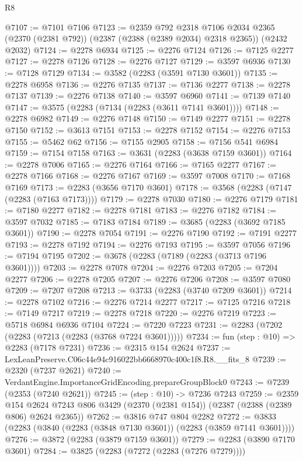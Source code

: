 \begin{lexlean}{R8}
\begin{coremodule}
@7107 := @7101 @7106
@7123 := @2359
    @792
    @2318
    @7106
    @2034
    @2365
    (@2370 (@2381 @792))
    (@2387 (@2388 (@2389 @2034) @2318 @2365))
    (@2432 @2032)
@7124 := @2278 @6934
@7125 := @2276 @7124
@7126 := @7125 @2277
@7127 := @2278 @7126
@7128 := @2276 @7127
@7129 := @3597 @6936
@7130 := @7128 @7129
@7134 := @3582 (@2283 (@3591 @7130 @3601))
@7135 := @2278 @6958
@7136 := @2276 @7135
@7137 := @7136 @2277
@7138 := @2278 @7137
@7139 := @2276 @7138
@7140 := @3597 @6960
@7141 := @7139 @7140
@7147 := @3575 (@2283 (@7134 (@2283 (@3611 @7141 @3601))))
@7148 := @2278 @6982
@7149 := @2276 @7148
@7150 := @7149 @2277
@7151 := @2278 @7150
@7152 := @3613 @7151
@7153 := @2278 @7152
@7154 := @2276 @7153
@7155 := @5462 @62
@7156 := @7155 @2905
@7158 := @7156 @541 @6984
@7159 := @7154 @7158
@7163 := @3631 (@2283 (@3638 @7159 @3601))
@7164 := @2278 @7006
@7165 := @2276 @7164
@7166 := @7165 @2277
@7167 := @2278 @7166
@7168 := @2276 @7167
@7169 := @3597 @7008
@7170 := @7168 @7169
@7173 := @2283 (@3656 @7170 @3601)
@7178 := @3568 (@2283 (@7147 (@2283 (@7163 @7173))))
@7179 := @2278 @7030
@7180 := @2276 @7179
@7181 := @7180 @2277
@7182 := @2278 @7181
@7183 := @2276 @7182
@7184 := @3597 @7032
@7185 := @7183 @7184
@7189 := @3685 (@2283 (@3692 @7185 @3601))
@7190 := @2278 @7054
@7191 := @2276 @7190
@7192 := @7191 @2277
@7193 := @2278 @7192
@7194 := @2276 @7193
@7195 := @3597 @7056
@7196 := @7194 @7195
@7202 := @3678 (@2283 (@7189 (@2283 (@3713 @7196 @3601))))
@7203 := @2278 @7078
@7204 := @2276 @7203
@7205 := @7204 @2277
@7206 := @2278 @7205
@7207 := @2276 @7206
@7208 := @3597 @7080
@7209 := @7207 @7208
@7213 := @3733 (@2283 (@3740 @7209 @3601))
@7214 := @2278 @7102
@7216 := @2276 @7214 @2277
@7217 := @7125 @7216
@7218 := @7149 @7217
@7219 := @2278 @7218
@7220 := @2276 @7219
@7223 := @5718 @6984 @6936 @7104
@7224 := @7220 @7223
@7231 := @2283 (@7202 (@2283 (@7213 (@2283 (@3768 @7224 @3601)))))
@7234 := fun (step : @10) => @2283 (@7178 @7231)
@7236 := @2315 @154 @2624
@7237 := LexLeanPreserve.C06c44e94c916022bb6668970c400c1f8.R8.__fits_8
@7239 := @2320 (@7237 @2621)
@7240 := VerdantEngine.ImportanceGridEncoding.prepareGroupBlock0
@7243 := @7239 (@2353 (@7240 @2621))
@7245 := (step : @10) -> @7236 @7243
@7259 := @2359
    @154
    @2624
    @7243
    @806
    @3429
    (@2370 (@2381 @154))
    (@2387 (@2388 (@2389 @806) @2624 @2365))
@7262 := @3816 @747 @804 @2282
@7272 := @3833 (@2283 (@3840 (@2283 (@3848 @7130 @3601)) (@2283 (@3859 @7141 @3601))))
@7276 := @3872 (@2283 (@3879 @7159 @3601))
@7279 := @2283 (@3890 @7170 @3601)
@7284 := @3825 (@2283 (@7272 (@2283 (@7276 @7279))))

\end{coremodule}
\end{lexlean}
